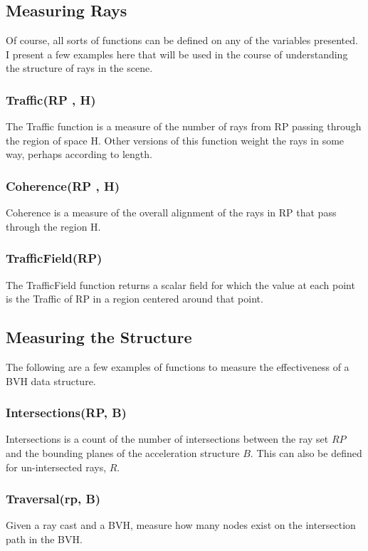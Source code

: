 \documentclass[twocolumn]{article}
\begin{document}
\subsection{Measuring Rays}
Of course, all sorts of functions can be defined on any of the variables presented. I present a few examples here that will be used in the course of understanding the structure of rays in the scene.

\subsubsection{Traffic(RP , H)}
The Traffic function is a measure of the number of rays from RP passing through the region of space H. Other versions of this function weight the rays in some way, perhaps according to length.

\subsubsection{Coherence(RP , H)}
Coherence is a measure of the overall alignment of the rays in RP that pass through the region H.

\subsubsection{TrafficField(RP)}
The TrafficField function returns a scalar field for which the value at each point is the Traffic of RP in a region centered around that point.

\subsection{Measuring the Structure} \label{bvh_funcs}

The following are a few examples of functions to measure the effectiveness of a BVH data structure.

\subsubsection{Intersections(RP, B)}
Intersections is a count of the number of intersections between the ray set $RP$ and the
bounding planes of the acceleration structure $B$. This can also be defined for un-intersected
rays, $R$.

\subsubsection{Traversal(rp, B)}
Given a ray cast and a BVH, measure how many nodes exist on the intersection path in the BVH.
\end{document}
